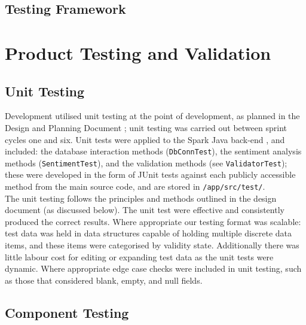 \documentclass[9pt, titlepage]{extarticle}
\begin{document}
\subsection{Testing Framework}

\hypertarget{testing-and-validation}{%
\section{Product Testing and Validation}\label{testing-and-validation}}

\hypertarget{unit-testing}{%
\subsection{Unit Testing}\label{unit-testing}}

Development utilised unit testing at the point of development, as planned
in the Design and Planning Document \cite{design-and-planning}; unit
testing was carried out between sprint cycles one and six. Unit tests 
were applied to the Spark Java back-end \cite{web:spark} , and included: the database 
interaction methods (\texttt{DbConnTest}), the sentiment analysis 
methods (\texttt{SentimentTest}), and the validation methods (see 
\texttt{ValidatorTest}); these were developed in the form of JUnit 
tests against each publicly accessible method from the main source code, and are stored in \texttt{/app/src/test/}.\\

The unit testing follows the principles and methods outlined in the design document (as discussed below). The unit test were effective and consistently produced the correct results. Where appropriate our testing format was scalable: test data was held in data structures capable of holding multiple discrete data items, and these items were categorised by validity state. Additionally there was little labour cost for editing or expanding test data as the unit tests were dynamic. Where appropriate edge case checks were included in unit testing, such as those that considered blank, empty, and null fields.\\

\newpage

\subsection{Component Testing}
\end{document}
